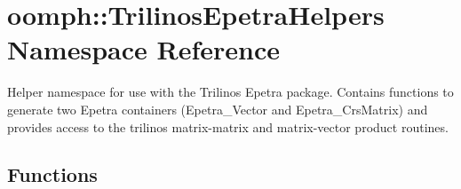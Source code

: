 \hypertarget{namespaceoomph_1_1TrilinosEpetraHelpers}{}\section{oomph\+:\+:Trilinos\+Epetra\+Helpers Namespace Reference}
\label{namespaceoomph_1_1TrilinosEpetraHelpers}


Helper namespace for use with the Trilinos Epetra package. Contains functions to generate two Epetra containers (Epetra\+\_\+\+Vector and Epetra\+\_\+\+Crs\+Matrix) and provides access to the trilinos matrix-\/matrix and matrix-\/vector product routines.  


\subsection*{Functions}

